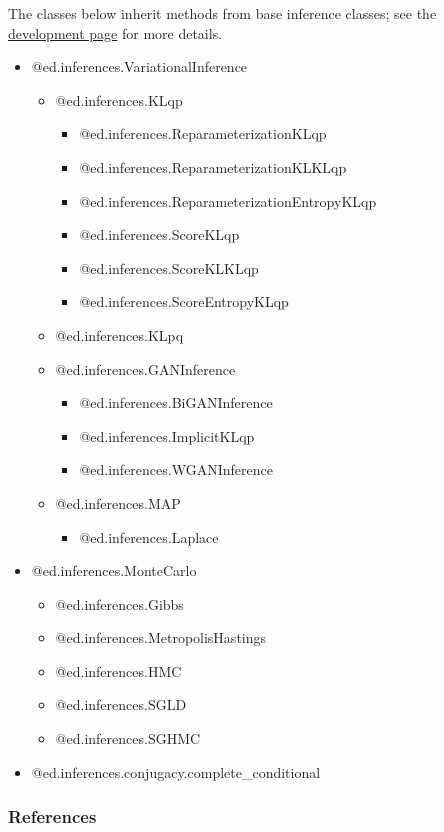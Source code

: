 The classes below inherit methods from base inference classes;
see the \href{/api/inference-development}{development page} for more
details.

\begin{itemize}
  \item @{ed.inferences.VariationalInference}
    \begin{itemize}
    \item @{ed.inferences.KLqp}
      \begin{itemize}
      \item @{ed.inferences.ReparameterizationKLqp}
      \item @{ed.inferences.ReparameterizationKLKLqp}
      \item @{ed.inferences.ReparameterizationEntropyKLqp}
      \item @{ed.inferences.ScoreKLqp}
      \item @{ed.inferences.ScoreKLKLqp}
      \item @{ed.inferences.ScoreEntropyKLqp}
      \end{itemize}
    \item @{ed.inferences.KLpq}
    \item @{ed.inferences.GANInference}
      \begin{itemize}
      \item @{ed.inferences.BiGANInference}
      \item @{ed.inferences.ImplicitKLqp}
      \item @{ed.inferences.WGANInference}
      \end{itemize}
    \item @{ed.inferences.MAP}
      \begin{itemize}
      \item @{ed.inferences.Laplace}
      \end{itemize}
    \end{itemize}
  \item @{ed.inferences.MonteCarlo}
    \begin{itemize}
    \item @{ed.inferences.Gibbs}
    \item @{ed.inferences.MetropolisHastings}
    \item @{ed.inferences.HMC}
    \item @{ed.inferences.SGLD}
    \item @{ed.inferences.SGHMC}
    \end{itemize}
  \item @{ed.inferences.conjugacy.complete_conditional}
\end{itemize}

\subsubsection{References}\label{references}
